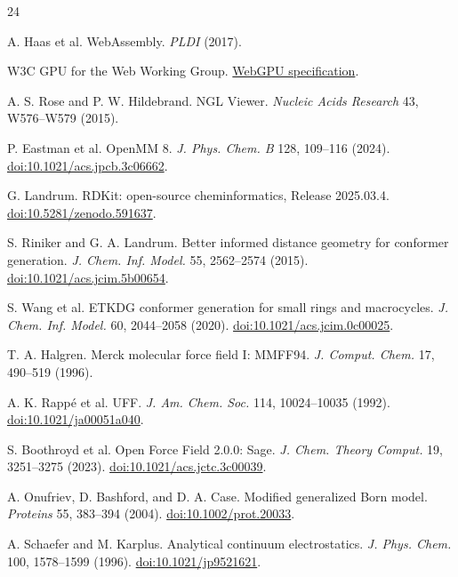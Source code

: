 \documentclass[10pt]{article}
\begin{document}
\begin{thebibliography}{24}\fontsize{8}{7.5}\selectfont
\setlength{\itemsep}{-3pt}
\setlength{\parsep}{0pt}

A. Haas et al. WebAssembly. \emph{PLDI} (2017).

W3C GPU for the Web Working Group. \href{https://www.w3.org/TR/webgpu/}{WebGPU
specification}.

A. S. Rose and P. W. Hildebrand. NGL Viewer. \emph{Nucleic Acids Research} 43,
W576--W579 (2015).

P. Eastman et al. OpenMM 8. \emph{J. Phys. Chem. B} 128, 109--116 (2024).
\href{https://doi.org/10.1021/acs.jpcb.3c06662}{doi:10.1021/acs.jpcb.3c06662}.

G. Landrum. RDKit: open-source cheminformatics, Release 2025.03.4.
\href{https://doi.org/10.5281/zenodo.591637}{doi:10.5281/zenodo.591637}.

S. Riniker and G. A. Landrum. Better informed distance geometry for conformer
generation. \emph{J. Chem. Inf. Model.} 55, 2562--2574 (2015).
\href{https://doi.org/10.1021/acs.jcim.5b00654}{doi:10.1021/acs.jcim.5b00654}.

S. Wang et al. ETKDG conformer generation for small rings and macrocycles.
\emph{J. Chem. Inf. Model.} 60, 2044--2058 (2020).
\href{https://doi.org/10.1021/acs.jcim.0c00025}{doi:10.1021/acs.jcim.0c00025}.

T. A. Halgren. Merck molecular force field I: MMFF94. \emph{J. Comput. Chem.}
17, 490--519 (1996).

A. K. Rapp\'e et al. UFF. \emph{J. Am. Chem. Soc.} 114, 10024--10035 (1992).
\href{https://doi.org/10.1021/ja00051a040}{doi:10.1021/ja00051a040}.

S. Boothroyd et al. Open Force Field 2.0.0: Sage. \emph{J. Chem. Theory Comput.}
19, 3251--3275 (2023).
\href{https://doi.org/10.1021/acs.jctc.3c00039}{doi:10.1021/acs.jctc.3c00039}.

A. Onufriev, D. Bashford, and D. A. Case. Modified generalized Born model.
\emph{Proteins} 55, 383--394 (2004).
\href{https://doi.org/10.1002/prot.20033}{doi:10.1002/prot.20033}.

A. Schaefer and M. Karplus. Analytical continuum electrostatics. \emph{J. Phys.
Chem.} 100, 1578--1599 (1996).
\href{https://doi.org/10.1021/jp9521621}{doi:10.1021/jp9521621}.


\end{thebibliography}
\end{document}
